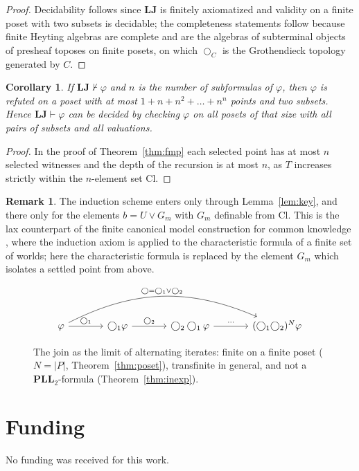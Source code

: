 \documentclass[11pt]{amsart}
\newtheorem{cor}[thm]{Corollary}
\theoremstyle{definition}
\newtheorem{rem}[thm]{Remark}
\newcommand{\LLJ}{\mathbf{LJ}}
\newcommand{\PLLt}{\mathbf{PLL}_2}
\newcommand{\lax}{\bigcirc}
\newcommand{\laxa}{\bigcirc_1}
\newcommand{\laxb}{\bigcirc_2}
\begin{document}
\begin{proof}
Decidability follows since $\LLJ$ is finitely axiomatized and validity on a
finite poset with two subsets is decidable; the completeness statements follow
because finite Heyting algebras are complete and are the algebras of
subterminal objects of presheaf toposes on finite posets, on which
$\lax_C$ is the Grothendieck topology generated by $C$.
\end{proof}

\begin{cor}\label{cor:size}
If $\LLJ\nvdash\varphi$ and $n$ is the number of subformulas of $\varphi$,
then $\varphi$ is refuted on a poset with at most $1+n+n^2+\dots+n^n$ points
and two subsets. Hence $\LLJ\vdash\varphi$ can be decided by checking $\varphi$
on all posets of that size with all pairs of subsets and all valuations.
\end{cor}
\begin{proof}
In the proof of Theorem~\ref{thm:fmp} each selected point has at most $n$
selected witnesses and the depth of the recursion is at most $n$, as $T$
increases strictly within the $n$-element set $\mathrm{Cl}$.
\end{proof}

\begin{rem}
The induction scheme enters only through Lemma~\ref{lem:key}, and there only
for the elements $b=U\vee G_m$ with $G_m$ definable from $\mathrm{Cl}$. This
is the lax counterpart of the finite canonical model construction for common
knowledge \cite{HM}, where the induction axiom is applied to the
characteristic formula of a finite set of worlds; here the characteristic
formula is replaced by the element $G_m$ which isolates a settled point from
above.
\end{rem}


\begin{figure}[ht]
\[
\begin{tikzcd}[column sep=large]
\varphi\arrow[r,"\laxa"]\arrow[rrr,bend left=25,"\lax=\laxa\vee\laxb"] & \laxa\varphi\arrow[r,"\laxb"] & \laxb\laxa\varphi\arrow[r,"\cdots"] & (\laxa\laxb)^N\varphi
\end{tikzcd}
\]
\caption{The join as the limit of alternating iterates: finite on a finite
poset ($N=|P|$, Theorem~\ref{thm:poset}), transfinite in general, and not a
$\PLLt$-formula (Theorem~\ref{thm:inexp}).}
\end{figure}

\section*{Funding}
No funding was received for this work.
\end{document}
